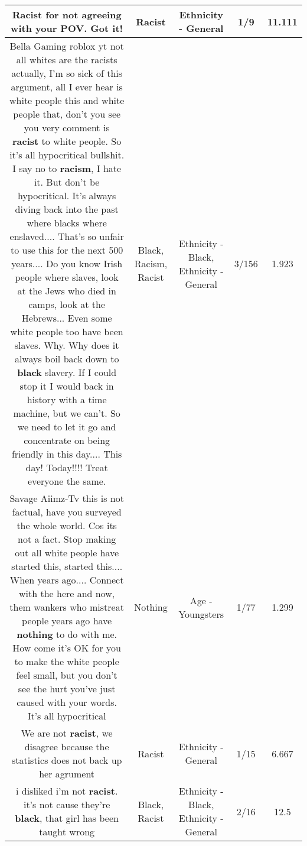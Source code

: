 \documentclass[11pt]{article}
\newlength\mylength
\begin{document}
\begin{center}
\begin{longtable}{|C{.65\mylength}|C{.30\mylength}|C{.12\mylength}|C{.12\mylength}|C{.12\mylength}|}
  \small Racist for not agreeing with your POV. Got it!\normalsize   & Racist & Ethnicity - General & 1/9 & 11.111 \\  \hline
  \small Bella Gaming roblox yt not all whites are the racists actually, I'm so sick of this argument, all I ever hear is white people this and white people that, don't you see you very comment is \textbf{racist} to white people. So it's all hypocritical bullshit. I say no to \textbf{racism}, I hate it. But don't be hypocritical. It's always diving back into the past where blacks where enslaved.... That's so unfair to use this for the next 500 years.... Do you know Irish people where slaves, look at the Jews who died in camps, look at the Hebrews... Even some white people too have been slaves. Why. Why does it always boil back down to \textbf{black} slavery. If I could stop it I would back in history with a time machine, but we can't. So we need to let it go and concentrate on being friendly in this day.... This day! Today!!!! Treat everyone the same.\normalsize   & Black, Racism, Racist & Ethnicity - Black, Ethnicity - General & 3/156 & 1.923 \\  \hline
  \small Savage Aiimz-Tv this is not factual, have you surveyed the whole world. Cos its not a fact. Stop making out all white people have started this, started this.... When years ago.... Connect with the here and now, them wankers who mistreat people years ago have \textbf{nothing} to do with me. How come it's OK for you to make the white people feel small, but you don't see the hurt you've just caused with your words. It's all hypocritical\normalsize   & Nothing & Age - Youngsters & 1/77 & 1.299 \\  \hline
  \small We are not \textbf{racist}, we disagree because the statistics does not back up her agrument\normalsize   & Racist & Ethnicity - General & 1/15 & 6.667 \\  \hline
  \small i disliked i'm not \textbf{racist}. it's not cause they're \textbf{black}, that girl has been taught wrong\normalsize   & Black, Racist & Ethnicity - Black, Ethnicity - General & 2/16 & 12.5 \\  \hline

\end{longtable}
\end{center}
\end{document}
